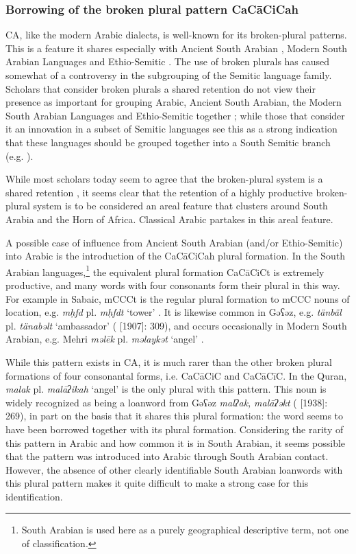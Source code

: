 \documentclass[output=paper]{langsci/langscibook}
\begin{document}
\subsubsection{\label{bkm:Ref13224664}Borrowing of the broken plural pattern CaCāCiCah}

CA, like the modern Arabic dialects, is well-known for its broken-plural patterns. This is a feature it shares especially with Ancient South Arabian \citep[1050--1051]{Stein2011}, Modern South Arabian Languages \citep[1085]{Simeone-Senelle2011} and Ethio-Semitic \citep[1132]{Weninger2011OldEth}. The use of broken plurals has caused somewhat of a controversy in the subgrouping of the Semitic language family. Scholars that consider broken plurals a shared retention do not view their presence as important for grouping Arabic, Ancient South Arabian, the Modern South Arabian Languages and Ethio-Semitic together \citep[159--160]{Huehnergard2005}; while those that consider it an innovation in a subset of Semitic languages see this as a strong indication that these languages should be grouped together into a South Semitic branch (e.g. \citealt{Ratcliffe1998}).

While most scholars today seem to agree that the broken-plural system is a shared retention \citep[1116]{Weninger2011GenEth}, it seems clear that the retention of a highly productive broken-plural system is to be considered an areal feature that clusters around South Arabia and the Horn of Africa. Classical Arabic partakes in this areal feature.

A possible case of influence from Ancient South Arabian (and/or Ethio-Semitic) into Arabic is the introduction of the CaCāCiCah plural formation. In the South Arabian languages,\footnote{South Arabian is used here as a purely geographical descriptive term, not one of classification.} the equivalent plural formation CaCāCiCt is extremely productive, and many words with four consonants form their plural in this way. For example in Sabaic, mCCCt is the regular plural formation to mCCC nouns  of location, e.g. \textit{mḥfd} pl. \textit{mḥfdt} ‘tower’ \citep[34]{Beeston1962}. It is likewise common in Gəʕəz, e.g. \textit{tänbäl} pl. \textit{tänabəlt} ‘ambassador’ (\citealt{Dillmann2005} [1907]: 309), and occurs occasionally in Modern South Arabian, e.g. Mehri \textit{məlēk} pl. \textit{məlaykət} ‘angel’ \citep[68]{Rubin2010}.

While this pattern exists in CA, it is much rarer than the other broken plural formations of four consonantal forms, i.e. CaCāCiC and CaCāCīC. In the Quran, \textit{malak} pl. \textit{malāʔikah} ‘angel’ is the only plural with this pattern. This noun is widely recognized as being a loanword from Gəʕəz \textit{malʔak,} \textit{malāʔəkt} (\citealt{Jeffrey2007} [1938]: 269), in part on the basis that it shares this plural formation: the word seems to have been borrowed together with its plural formation. Considering the rarity of this pattern in Arabic and how common it is in South Arabian, it seems possible that the pattern was introduced into Arabic through South Arabian contact. However, the absence of other clearly identifiable South Arabian loanwords with this plural pattern makes it quite difficult to make a strong case for this identification.
\end{document}
